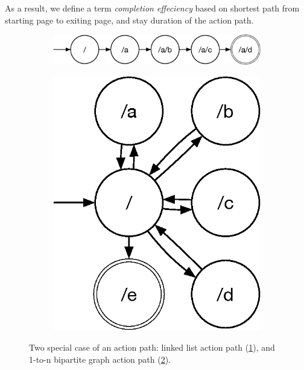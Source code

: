 As a result, we define a term \emph{completion effeciency} based on shortest path from starting page
to exiting page, and stay duration of the action path. 

\begin{figure}[H]
    \centering

\begin{subfigure}[b]{0.55\textwidth}
    \includegraphics[width=1\textwidth]{figures/linked-list}
    \caption{}
    \label{fig:sim-action-1}
\end{subfigure}
    
\begin{subfigure}[b]{0.23\textwidth}
    \includegraphics[width=1\textwidth]{figures/1ton}
    \caption{}
    \label{fig:sim-action-2}
\end{subfigure}

\caption{Two special case of an action path: linked list action path (\ref{fig:sim-action-1}), and 
1-to-n bipartite graph action path (\ref{fig:sim-action-2}).}
\label{fig:sim-action-path}
\end{figure}

